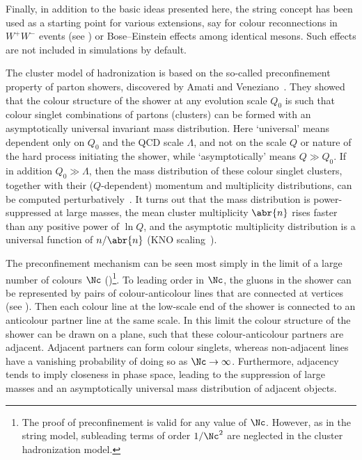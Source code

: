 Finally, in addition to the basic ideas presented here, the string 
concept has been used as a starting point for various extensions, 
say for colour reconnections in $W^+W^-$ events (see
) or Bose--Einstein effects among identical
mesons. Such effects are not included in simulations by default.


\label{sec:cluster-model}
The cluster model of hadronization is based on the so-called
preconfinement property of parton showers, discovered by Amati and
Veneziano~\cite{Amati:1979fg}.  They showed that the colour structure of the
shower at any evolution scale $Q_0$ is such that colour singlet
combinations of partons (clusters) can be formed with an
asymptotically universal invariant mass distribution.  Here
`universal' means dependent only on $Q_0$ and the QCD scale $\Lambda$,
and not on the scale $Q$ or nature of the hard process initiating the
shower, while `asymptotically' means $Q\gg Q_0$.  If in addition
$Q_0\gg\Lambda$, then the mass distribution of these colour singlet
clusters, together with their ($Q$-dependent) momentum and
multiplicity distributions, can be computed
perturbatively~\cite{Amati:1979fg,Bassetto:1979vy}.  It turns out that the mass distribution
is power-suppressed at large masses, the mean cluster
multiplicity $\abr{n}$ rises faster than any positive power of $\ln Q$,
and the asymptotic multiplicity distribution is a universal function
of $n/\abr{n}$ (KNO scaling~\cite{Koba:1972ng}).

The preconfinement mechanism can be seen most simply in the limit
of a large number of colours $\Nc$ (\cf{})\footnote{The proof of preconfinement is
  valid for any value of $\Nc$.   However, as in the string model,
  subleading terms of order $1/\Nc^2$ are neglected in the cluster
hadronization model.}.   To leading order in $\Nc$, the gluons in
the shower can be represented by pairs of colour-anticolour lines
that are connected at vertices (see ).  Then each
colour line at the low-scale end of the shower is connected to an
anticolour partner line at the same scale.  In this limit the
colour structure of the shower can be drawn on a plane, such that
these colour-anticolour partners are adjacent.  Adjacent partners can
form colour singlets, whereas non-adjacent lines have a vanishing
probability of doing so as $\Nc\to\infty$.   Furthermore, adjacency
tends to imply closeness in phase space, leading to the suppression of large
masses and an asymptotically universal mass distribution of adjacent
objects.  

